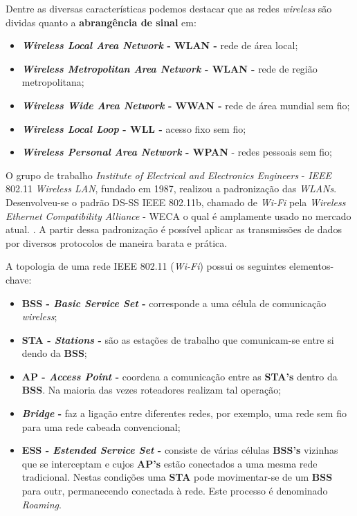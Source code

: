 Dentre as diversas características podemos destacar que as redes \textit{wireless} são dividas quanto a \textbf{abrangência de sinal} em:

\begin{itemize}
	\item \textbf{\textit{Wireless Local Area Network} - WLAN - } rede de área local;
	\item \textbf{\textit{Wireless Metropolitan Area Network} - WLAN - } rede de região metropolitana;
	\item \textbf{\textit{Wireless Wide Area Network} - WWAN - } rede de área mundial sem fio;
	\item \textbf{\textit{Wireless Local Loop} - WLL - } acesso fixo sem fio;
	\item \textbf{\textit{Wireless Personal Area Network} - WPAN} - redes pessoais sem fio;
\end{itemize}


O grupo de trabalho \textit{Institute of Electrical and Electronics Engineers} - \textit{IEEE} 802.11\textit{ Wireless LAN}, fundado em 1987, realizou a padronização das \textit{WLANs}. Desenvolveu-se o padrão DS-SS IEEE 802.11b, chamado de \textit{Wi-Fi} pela \textit{Wireless Ethernet Compatibility Alliance} - WECA o qual é amplamente usado no mercado atual. \cite{internetdascoisassemmisterios}. A partir dessa padronização é possível aplicar as transmissões de dados por diversos protocolos de maneira barata e prática.

A topologia de uma rede IEEE 802.11 (\textit{Wi-Fi})  possui os seguintes elementos-chave:

\begin{itemize}
	\item \textbf{BSS - \textit{Basic Service Set} -} corresponde a uma célula de comunicação \textit{wireless};
	\item \textbf{STA - \textit{Stations} -} são as estações de trabalho que comunicam-se entre si dendo da \textbf{BSS};
	\item \textbf{AP - \textit{Access Point} -} coordena a comunicação entre as \textbf{STA's} dentro da \textbf{BSS}. Na maioria das vezes roteadores realizam tal operação;
	\item \textbf{\textit{Bridge} -} faz a ligação entre diferentes redes, por exemplo, uma rede sem fio para uma rede cabeada convencional;
	\item  \textbf{ESS - \textit{Estended Service Set} -} consiste de várias células \textbf{BSS's} vizinhas que se interceptam e cujos \textbf{AP's} estão conectados a uma mesma rede tradicional. Nestas condições uma \textbf{STA} pode movimentar-se de um \textbf{BSS} para outr, permanecendo conectada à rede. Este processo é denominado \textit{Roaming}.
\end{itemize}

